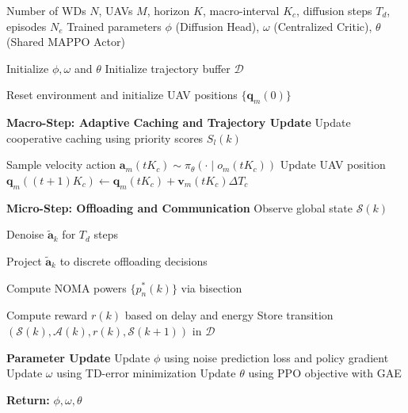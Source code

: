 \documentclass[journal]{IEEEtran}
\begin{document}
\begin{algorithm}[!ht]
\caption{Proposed DMJO Framework}
\small
\label{alg:joint_opt}
\begin{algorithmic}[1]

\Require Number of WDs $N$, UAVs $M$, horizon $K$, macro-interval $K_c$, diffusion steps $T_d$, episodes $N_e$
\Ensure Trained parameters $\phi$ (Diffusion Head), $\omega$ (Centralized Critic), $\theta$ (Shared MAPPO Actor)

\State Initialize $\phi, \omega$ and $\theta$
\State Initialize trajectory buffer $\mathcal{D}$

    \State Reset environment and initialize UAV positions $\{\mathbf{q}_m(0)\}$

        
        \State \textbf{Macro-Step: Adaptive Caching and Trajectory Update}
        \State Update cooperative caching using priority scores $S_l(k)$
        
            \State Sample velocity action $\mathbf{a}_m(tK_c) \sim \pi_{\theta}(\cdot \mid o_m(tK_c))$
            \State Update UAV position $\mathbf{q}_m((t+1)K_c) \leftarrow \mathbf{q}_m(tK_c) + \mathbf{v}_m(tK_c)\Delta T_c$
        \EndFor

            
            \State \textbf{Micro-Step: Offloading and Communication}
            \State Observe global state $\mathcal{S}(k)$
            
            \State Denoise $\tilde{\mathbf{a}}_k$ for $T_d$ steps
            
            \State Project $\tilde{\mathbf{a}}_k$ to discrete offloading decisions
            
            \State Compute NOMA powers $\{p_n^\ast(k)\}$ via bisection
            
            \State Compute reward $r(k)$ based on delay and energy
            \State Store transition $(\mathcal{S}(k), \mathcal{A}(k), r(k), \mathcal{S}(k+1))$ in $\mathcal{D}$
        
        \EndFor
    \EndFor

    \State \textbf{Parameter Update}
    \State Update $\phi$ using noise prediction loss and policy gradient
    \State Update $\omega$ using TD-error minimization
    \State Update $\theta$ using PPO objective with GAE

\EndFor

\State \textbf{Return:} $\phi, \omega, \theta$

\end{algorithmic}
\end{algorithm}
\end{document}
